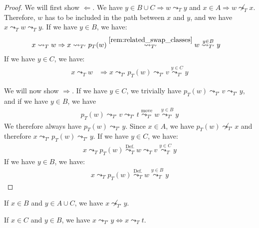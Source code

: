 \begin{proof}
    We will first show $\Leftarrow$. We have $y \in B \cup C \Rightarrow w \leadsto_T y$ and $x \in A \Rightarrow w \not\leadsto_T x$. Therefore, $w$ has to be included in the path between $x$ and $y$, and we have $x \leadsto_T w \leadsto_T y$. If we have $y \in B$, we have:
    \begin{align*}
    x \leadsto_T w &\Rightarrow x \leadsto_{T'} p_T(w) \stackrel{\ref{rem:related_swap_classes}}{\leadsto_{T'}} w \stackrel{y \in B}{\leadsto_{T'}} y
    \end{align*}
    If we have $y \in C$, we have:
    \begin{align*}
        x \leadsto_T w &\Rightarrow x \leadsto_{T'} p_T(w) \leadsto_{T'} v \stackrel{y \in C}{\leadsto_{T'}} y
    \end{align*}

    We will now show $\Rightarrow$. If we have $y \in C$, we trivially have $p_T(w) \leadsto_{T'} v \leadsto_{T'} y$, and if we have $y \in B$, we have
    \begin{align*}
        p_T(w) \leadsto_{T'} v \leadsto_{T'} t \stackrel{\text{move}}{\leadsto_{T'}} w \stackrel{y \in B}{\leadsto_{T'}} y    
    \end{align*}
    We therefore always have $p_T(w) \leadsto_{T'} y$. Since $x \in A$, we have $p_T(w) \not\leadsto_{T'} x$ and therefore $x \leadsto_{T'} p_T(w) \leadsto_{T'} y$. If we have $y \in C$, we have:
    \begin{align*}
        x \leadsto_T p_T(w) \stackrel{\text{Def.}}{\leadsto_T} w \leadsto_T v \stackrel{y \in C}{\leadsto_T} y
    \end{align*}
    If we have $y \in B$, we have:
    \begin{align*}
        x \leadsto_T p_T(w) \stackrel{\text{Def.}}{\leadsto_T} w \stackrel{y \in B}{\leadsto_T} y
    \end{align*}
\end{proof}

\begin{lemma}
    \label{lem:related_swap_bac}
    If $x \in B$ and $y \in A \cup C$, we have $x \not\leadsto_{T'} y$.
\end{lemma}


\begin{lemma}
    \label{lem:related_swap_cb}
    If $x \in C$ and $y \in B$, we have $x \leadsto_{T'} y \Leftrightarrow x \leadsto_T t$.
\end{lemma}

